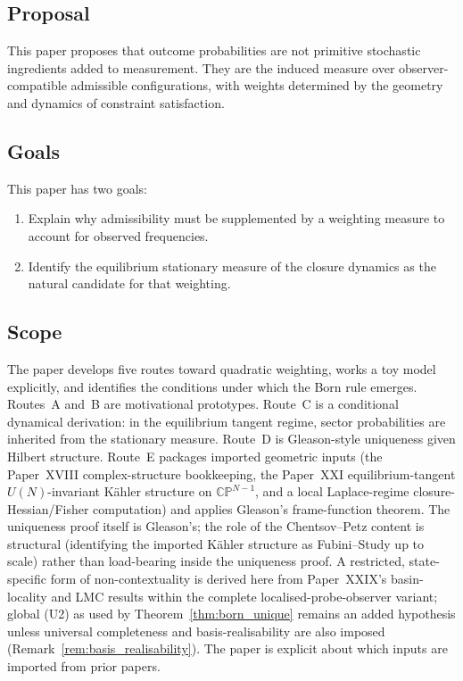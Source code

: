 \documentclass[12pt]{article}
\begin{document}
\subsection*{Proposal}

This paper proposes that outcome probabilities are not primitive stochastic ingredients added to measurement. They are the induced measure over observer-compatible admissible configurations, with weights determined by the geometry and dynamics of constraint satisfaction.

\subsection*{Goals}

This paper has two goals:
\begin{enumerate}
    \item Explain why admissibility must be supplemented by a weighting measure to account for observed frequencies.
    \item Identify the equilibrium stationary measure of the closure dynamics as the natural candidate for that weighting.
\end{enumerate}

\subsection*{Scope}

The paper develops five routes toward quadratic weighting, works a toy model explicitly, and identifies the conditions under which the Born rule emerges. Routes~A and~B are motivational prototypes. Route~C is a conditional dynamical derivation: in the equilibrium tangent regime, sector probabilities are inherited from the stationary measure. Route~D is Gleason-style uniqueness given Hilbert structure. Route~E packages imported geometric inputs (the Paper~XVIII complex-structure bookkeeping, the Paper~XXI equilibrium-tangent $U(N)$-invariant K\"ahler structure on $\mathbb{CP}^{N-1}$, and a local Laplace-regime closure-Hessian/Fisher computation) and applies Gleason's frame-function theorem. The uniqueness proof itself is Gleason's; the role of the Chentsov--Petz content is structural (identifying the imported K\"ahler structure as Fubini--Study up to scale) rather than load-bearing inside the uniqueness proof. A restricted, state-specific form of non-contextuality is derived here from Paper~XXIX's basin-locality and LMC results within the complete localised-probe-observer variant; global (U2) as used by Theorem~\ref{thm:born_unique} remains an added hypothesis unless universal completeness and basis-realisability are also imposed (Remark~\ref{rem:basis_realisability}). The paper is explicit about which inputs are imported from prior papers.
\end{document}
